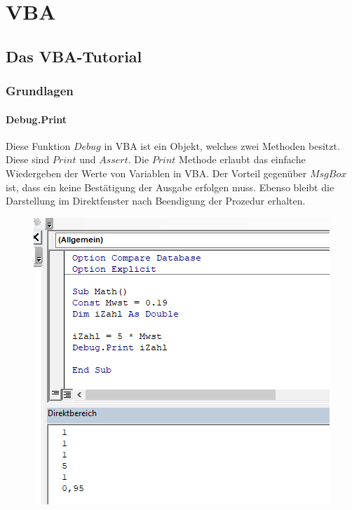 \pagebreak
\chapter{VBA}
\setcounter{section}{0}
\section{Das VBA-Tutorial}
\subsection{Grundlagen}
\subsubsection{Debug.Print}
Diese Funktion $Debug$ in \gls{VBA} ist ein Objekt, welches zwei Methoden besitzt. Diese sind $Print$ und $Assert$. Die $Print$ Methode erlaubt das einfache Wiedergeben der Werte von Variablen in \gls{VBA}. Der Vorteil gegenüber $MsgBox$ ist, dass ein keine Bestätigung der Ausgabe erfolgen muss. Ebenso bleibt die Darstellung im Direktfenster nach Beendigung der Prozedur erhalten.
\begin{figure}[H]
	\centering
	\includegraphics[scale = 0.3]{attachment/chapter_2/Scc026}
	\caption{}
	\label{fig:Scc026}
\end{figure} 

